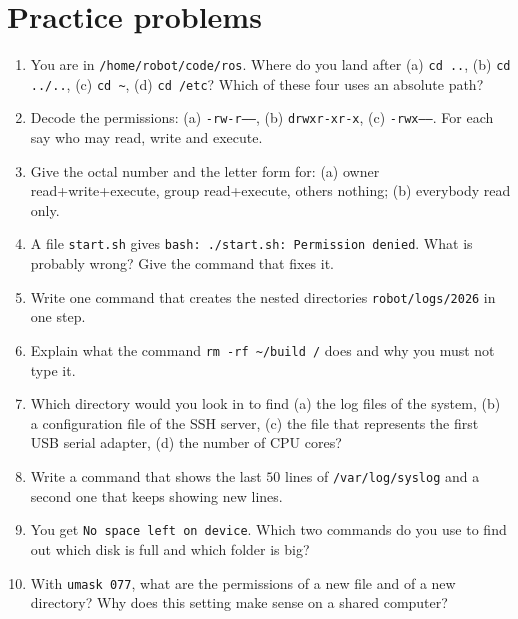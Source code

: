 \section*{Practice problems}
\begin{enumerate}[label=\textbf{\thechapter.\arabic*}]
  \item You are in \texttt{/home/robot/code/ros}. Where do you land after (a) \verb|cd ..|, (b) \verb|cd ../..|, (c) \verb|cd ~|, (d) \verb|cd /etc|? Which of these four uses an absolute path?
  \item Decode the permissions: (a) \texttt{-rw-r-----}, (b) \texttt{drwxr-xr-x}, (c) \texttt{-rwx------}. For each say who may read, write and execute.
  \item Give the octal number and the letter form for: (a) owner read+write+execute, group read+execute, others nothing; (b) everybody read only.
  \item A file \texttt{start.sh} gives \texttt{bash: ./start.sh: Permission denied}. What is probably wrong? Give the command that fixes it.
  \item Write one command that creates the nested directories \texttt{robot/logs/2026} in one step.
  \item Explain what the command \verb|rm -rf ~/build /| does and why you must not type it.
  \item Which directory would you look in to find (a) the log files of the system, (b) a configuration file of the SSH server, (c) the file that represents the first USB serial adapter, (d) the number of CPU cores?
  \item Write a command that shows the last $50$ lines of \texttt{/var/log/syslog} and a second one that keeps showing new lines.
  \item You get \texttt{No space left on device}. Which two commands do you use to find out which disk is full and which folder is big?
  \item[\textbf{\thechapter.10}$\star$] With \texttt{umask 077}, what are the permissions of a new file and of a new directory? Why does this setting make sense on a shared computer?
\end{enumerate}

